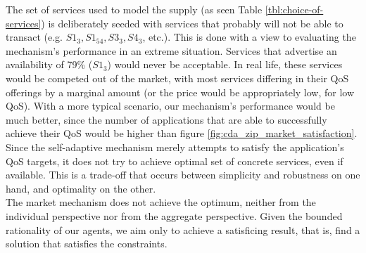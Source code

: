 \documentclass[10pt,journal,compsoc]{IEEEtran}
\begin{document}
The set of services used to model the supply (as seen Table \ref{tbl:choice-of-services}) is deliberately seeded with services that probably will not be able to transact (e.g. $S1_{3}, S1_{54}, S3_{3}, S4_{3}$, etc.). This is done with a view to evaluating the mechanism's performance in an extreme situation. Services that advertise an availability of 79\% ($S1_{3}$) would never be acceptable.  In real life, these services would be competed out of the market, with most services differing in their QoS offerings by a marginal amount (or the price would be appropriately low, for low QoS). With a more typical scenario, our mechanism's performance would be much better, since the number of applications that are able to successfully achieve their QoS would be higher than figure \ref{fig:cda_zip_market_satisfaction}. Since the self-adaptive mechanism merely attempts to satisfy the application's QoS targets, it does not try to achieve  optimal set of concrete services, even if available. This is a trade-off that occurs between simplicity and robustness on one hand, and optimality on the other.\\

The market mechanism does not achieve the optimum, neither from the individual perspective nor from the aggregate perspective. Given the bounded rationality of our agents, we aim only to achieve a satisficing result, that is, find a solution that satisfies the constraints. 
\end{document}
